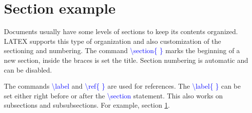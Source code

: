\section{Section example}\label{sec:Section example}

Documents usually have some levels of sections to keep its contents organized. LATEX supports this type of organization and also customization of the sectioning and numbering. The command \textcolor{blue}{\textbackslash section\{ \}} marks the beginning of a new section, inside the braces is set the title. Section numbering is automatic and can be disabled. 

The commands \textcolor{blue}{\textbackslash label} and \textcolor{blue}{\textbackslash ref\{ \}} are used for references. The \textcolor{blue}{\textbackslash label\{ \}} can be set either right before or after the \textcolor{blue}{\textbackslash section} statement. This also works on subsections and subsubsections. For example, section \ref{sec:Section example}.
